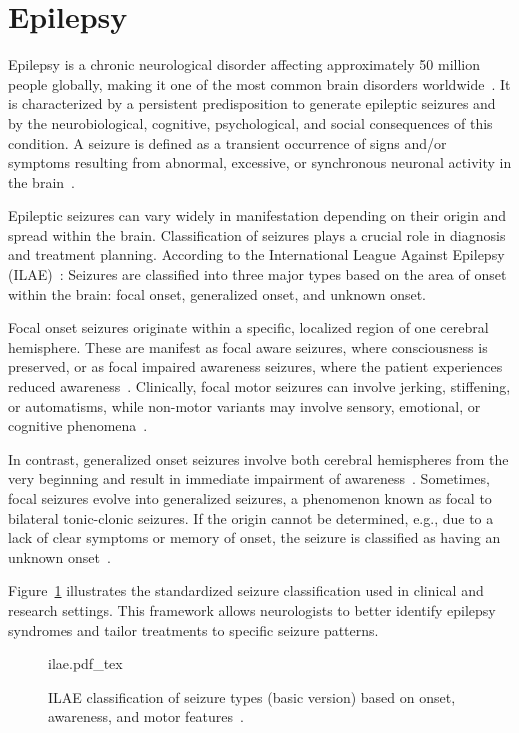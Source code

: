 \section{Epilepsy}
Epilepsy is a chronic neurological disorder affecting approximately 50 million people globally, making it one of the most common brain disorders worldwide~\cite{whoEpilepsy}. It is characterized by a persistent predisposition to generate epileptic seizures and by the neurobiological, cognitive, psychological, and social consequences of this condition. A seizure is defined as a transient occurrence of signs and/or symptoms resulting from abnormal, excessive, or synchronous neuronal activity in the brain~\cite{fisher2014}.

Epileptic seizures can vary widely in manifestation depending on their origin and spread within the brain. Classification of seizures plays a crucial role in diagnosis and treatment planning. According to the International League Against Epilepsy (ILAE)~\cite{epilepsy2}: Seizures are classified into three major types based on the area of onset within the brain: focal onset, generalized onset, and unknown onset. 

Focal onset seizures originate within a specific, localized region of one cerebral hemisphere. These are manifest as focal aware seizures, where consciousness is preserved, or as focal impaired awareness seizures, where the patient experiences reduced awareness~\cite{epilepsy2}. Clinically, focal motor seizures can involve jerking, stiffening, or automatisms, while non-motor variants may involve sensory, emotional, or cognitive phenomena~\cite{fisher2017}.

In contrast, generalized onset seizures involve both cerebral hemispheres from the very beginning and result in immediate impairment of awareness~\cite{epilepsy2}. Sometimes, focal seizures evolve into generalized seizures, a phenomenon known as focal to bilateral tonic-clonic seizures. If the origin cannot be determined, e.g., due to a lack of clear symptoms or memory of onset, the seizure is classified as having an unknown onset~\cite{fisher2017}.

Figure~\ref{fig:seizure_flow} illustrates the standardized seizure classification used in clinical and research settings. This framework allows neurologists to better identify epilepsy syndromes and tailor treatments to specific seizure patterns.

\begin{figure}[htb]
	\centering
    \def\svgwidth{420pt}
    \fontsize{9pt}{9pt}
 	{ilae.pdf_tex} 	 	
	\caption[ILAE Seizure Classification Flowchart]{ILAE classification of seizure types (basic version) based on onset, awareness, and motor features~\cite{epilepsyDiagram}.}
	\label{fig:seizure_flow}
\end{figure}

